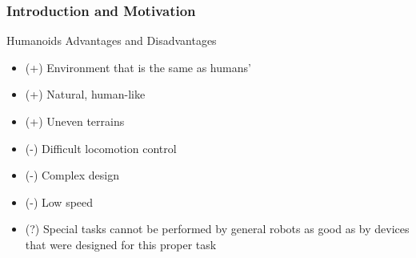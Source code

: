 \documentclass{beamer}
\begin{document}

	\begin{frame}
		\frametitle{Introduction and Motivation}
		\begin{block}{Humanoids Advantages and Disadvantages}
			\begin{itemize}
				\item(+)
					Environment that is the same as humans'
				\item(+)
					Natural, human-like
				\item(+)
					Uneven terrains
				\item(-)
					Difficult locomotion control
				\item(-)
					Complex design
				\item(-)
					Low speed
				\item(?) Special tasks cannot be performed by general robots as good as by devices that were designed for this proper task
			\end{itemize}
		\end{block}
	\end{frame}

\end{document}
